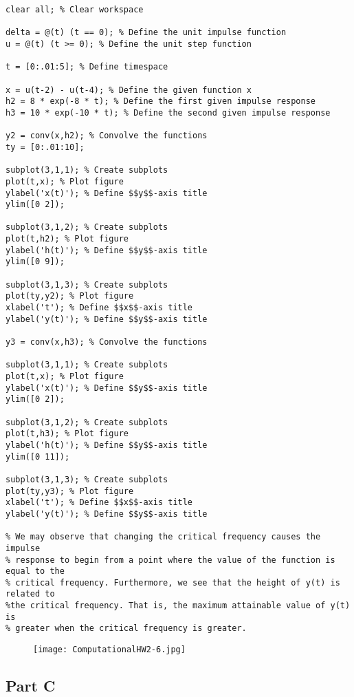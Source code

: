 \documentclass[10pt]{article}
\begin{document}
\begin{lstlisting}
clear all; % Clear workspace

delta = @(t) (t == 0); % Define the unit impulse function
u = @(t) (t >= 0); % Define the unit step function

t = [0:.01:5]; % Define timespace

x = u(t-2) - u(t-4); % Define the given function x
h2 = 8 * exp(-8 * t); % Define the first given impulse response
h3 = 10 * exp(-10 * t); % Define the second given impulse response

y2 = conv(x,h2); % Convolve the functions
ty = [0:.01:10];

subplot(3,1,1); % Create subplots
plot(t,x); % Plot figure
ylabel('x(t)'); % Define $$y$$-axis title
ylim([0 2]);

subplot(3,1,2); % Create subplots
plot(t,h2); % Plot figure
ylabel('h(t)'); % Define $$y$$-axis title
ylim([0 9]);

subplot(3,1,3); % Create subplots
plot(ty,y2); % Plot figure
xlabel('t'); % Define $$x$$-axis title
ylabel('y(t)'); % Define $$y$$-axis title

y3 = conv(x,h3); % Convolve the functions

subplot(3,1,1); % Create subplots
plot(t,x); % Plot figure
ylabel('x(t)'); % Define $$y$$-axis title
ylim([0 2]);

subplot(3,1,2); % Create subplots
plot(t,h3); % Plot figure
ylabel('h(t)'); % Define $$y$$-axis title
ylim([0 11]);

subplot(3,1,3); % Create subplots
plot(ty,y3); % Plot figure
xlabel('t'); % Define $$x$$-axis title
ylabel('y(t)'); % Define $$y$$-axis title

% We may observe that changing the critical frequency causes the impulse
% response to begin from a point where the value of the function is equal to the
% critical frequency. Furthermore, we see that the height of y(t) is related to
%the critical frequency. That is, the maximum attainable value of y(t) is
% greater when the critical frequency is greater.
\end{lstlisting}
\begin{figure}[!ht]
\texttt{[image: ComputationalHW2-6.jpg]}
\end{figure}


{}
\subsection*{Part C}
\end{document}
